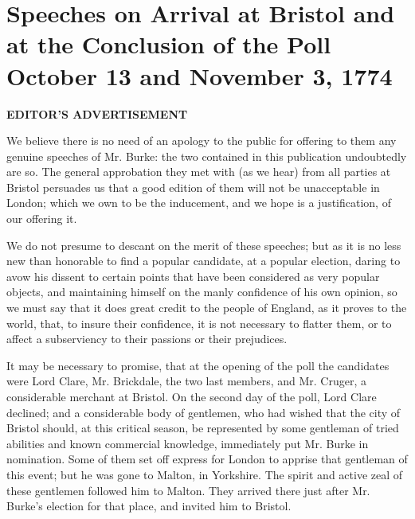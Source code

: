 \chapter*[Speeches on Arrival at Bristol]{Speeches on Arrival at Bristol 
and at the Conclusion of the Poll
\\ \vspace{0.1cm}\large{October 13 and November 3, 1774}}

\begin{center}
  \textbf{\large EDITOR'S ADVERTISEMENT} \par 
\end{center}

We believe there is no need of an apology to the public for offering to them any genuine speeches of Mr. Burke: the two contained in this publication undoubtedly are so. The general approbation they met with (as we hear) from all parties at Bristol persuades us that a good edition of them will not be unacceptable in London; which we own to be the inducement, and we hope is a justification, of our offering it.

We do not presume to descant on the merit of these speeches; but as it is no less new than honorable to find a popular candidate, at a popular election, daring to avow his dissent to certain points that have been considered as very popular objects, and maintaining himself on the manly confidence of his own opinion, so we must say that it does great credit to the people of England, as it proves to the world, that, to insure their confidence, it is not necessary to flatter them, or to affect a subserviency to their passions or their prejudices.

It may be necessary to promise, that at the opening of the poll the candidates were Lord Clare, Mr. Brickdale, the two last members, and Mr. Cruger, a considerable merchant at Bristol. On the second day of the poll, Lord Clare declined; and a considerable body of gentlemen, who had wished that the city of Bristol should, at this critical season, be represented by some gentleman of tried abilities and known commercial knowledge, immediately put Mr. Burke in nomination. Some of them set off express for London to apprise that gentleman of this event; but he was gone to Malton, in Yorkshire. The spirit and active zeal of these gentlemen followed him to Malton. They arrived there just after Mr. Burke's election for that place, and invited him to Bristol.

